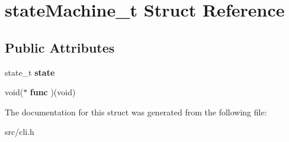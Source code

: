 \hypertarget{structstateMachine__t}{}\section{state\+Machine\+\_\+t Struct Reference}
\label{structstateMachine__t}
\subsection*{Public Attributes}
\begin{DoxyCompactItemize}
\item 
\mbox{\label{structstateMachine__t_a9f499c095594429c8e34ae5c27107b5a}} 
state\+\_\+t {\bfseries state}
\item 
\mbox{\label{structstateMachine__t_a7b3ef4521e2f68efbc13bcb9a8e36efb}} 
void($\ast$ {\bfseries func} )(void)
\end{DoxyCompactItemize}


The documentation for this struct was generated from the following file\+:\begin{DoxyCompactItemize}
\item 
src/cli.\+h\end{DoxyCompactItemize}

